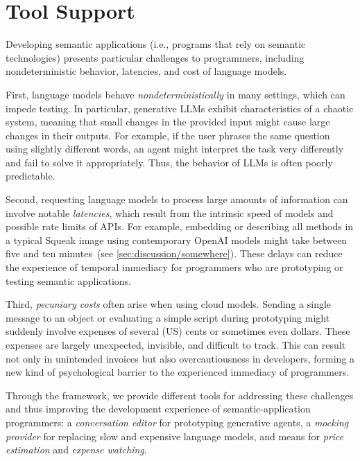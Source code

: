 
\section{Tool Support}
\label{sec:semtex/tools}

Developing semantic applications (i.e., programs that rely on semantic technologies) presents particular challenges to programmers, including nondeterministic behavior, latencies, and cost of language models.

First, language models behave \emph{nondeterministically} in many settings, which can impede testing.
In particular, generative LLMs exhibit characteristics of a chaotic system, meaning that small changes in the provided input might cause large changes in their outputs.
For example, if the user phrases the same question using slightly different words, an agent might interpret the task very differently and fail to solve it appropriately.
Thus, the behavior of LLMs is often poorly predictable.

Second, requesting language models to process large amounts of information can involve notable \emph{latencies}, which result from the intrinsic speed of models and possible rate limits of APIs.
For example, embedding or describing all methods in a typical Squeak image using contemporary OpenAI models might take between five and ten minutes~(see \cref{sec:discussion/somewhere}).
These delays can reduce the experience of temporal immediacy for programmers who are prototyping or testing semantic applications.

Third, \emph{pecuniary costs} often arise when using cloud models.
Sending a single message to an object or evaluating a simple script during prototyping might suddenly involve expenses of several (US) cents or sometimes even dollars.
These expenses are largely unexpected, invisible, and difficult to track.
This can result not only in unintended invoices but also overcautiousness in developers, forming a new kind of psychological barrier to the experienced immediacy of programmers.

Through the \semtex framework, we provide different tools for addressing these challenges and thus improving the development experience of semantic-application programmers:
a \emph{conversation editor} for prototyping generative agents, a \emph{mocking provider} for replacing slow and expensive language models, and means for \emph{price estimation} and \emph{expense watching}.

